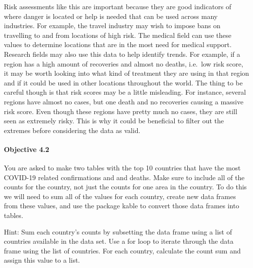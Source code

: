 \documentclass[
]{article}
\begin{document}
Risk assessments like this are important because they are good
indicators of where danger is located or help is needed that can be used
across many industries. For example, the travel industry may wish to
impose bans on travelling to and from locations of high risk. The
medical field can use these values to determine locations that are in
the most need for medical support. Research fields may also use this
data to help identify trends. For example, if a region has a high amount
of recoveries and almost no deaths, i.e.~low risk score, it may be worth
looking into what kind of treatment they are using in that region and if
it could be used in other locations throughout the world. The thing to
be careful though is that risk scores may be a little misleading. For
instance, several regions have almost no cases, but one death and no
recoveries causing a massive risk score. Even though these regions have
pretty much no cases, they are still seen as extremely risky. This is
why it could be beneficial to filter out the extremes before considering
the data as valid.

\hypertarget{objective-4.2}{%
\paragraph{Objective 4.2}\label{objective-4.2}}

You are asked to make two tables with the top 10 countries that have the
most COVID-19 related confirmations and and deaths. Make sure to include
all of the counts for the country, not just the counts for one area in
the country. To do this we will need to sum all of the values for each
country, create new data frames from these values, and use the package
kable to convert those data frames into tables.

Hint: Sum each country's counts by subsetting the data frame using a
list of countries available in the data set. Use a for loop to iterate
through the data frame using the list of countries. For each country,
calculate the count sum and assign this value to a list.
\end{document}
